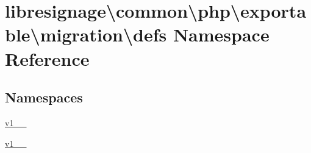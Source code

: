 \hypertarget{namespacelibresignage_1_1common_1_1php_1_1exportable_1_1migration_1_1defs}{}\section{libresignage\textbackslash{}common\textbackslash{}php\textbackslash{}exportable\textbackslash{}migration\textbackslash{}defs Namespace Reference}
\label{namespacelibresignage_1_1common_1_1php_1_1exportable_1_1migration_1_1defs}
\subsection*{Namespaces}
\begin{DoxyCompactItemize}
\item 
 \hyperlink{namespacelibresignage_1_1common_1_1php_1_1exportable_1_1migration_1_1defs_1_1v1__0__0}{v1\+\_\+\_}
\item 
 \hyperlink{namespacelibresignage_1_1common_1_1php_1_1exportable_1_1migration_1_1defs_1_1v1__1__0}{v1\+\_\+\_}
\end{DoxyCompactItemize}
